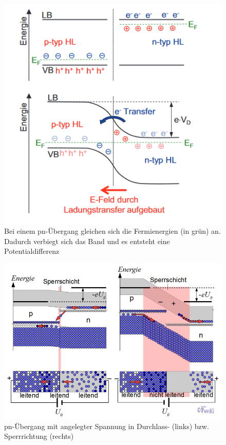 \begin{figure}[h]
    \centering
    \includegraphics[scale=0.7]{Bilder/Bandverbiegung.png}
    \caption{Bei einem pn-Übergang gleichen sich die Fermienergien (in grün) an. Dadurch verbiegt sich das Band und es entsteht eine 
    Potentialdifferenz \protect \footnotemark}
\end{figure}


\begin{figure}[h]
    \centering
    \includegraphics[scale=0.45]{Bilder/DurchlassSperr.jpg}
    \caption{pn-Übergang mit angelegter Spannung in Durchlass- (links) bzw. Sperrrichtung (rechts) \protect \footnotemark}
\end{figure}

